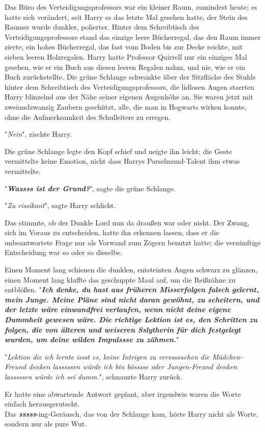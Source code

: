 {Das Büro des Verteidigungsprofessors war ein kleiner Raum, zumindest heute; es hatte sich verändert, seit Harry es das letzte Mal gesehen hatte, der Stein des Raumes wurde dunkler, polierter. Hinter dem Schreibtisch des Verteidigungsprofessors stand das einzige leere Bücherregal, das den Raum immer zierte, ein hohes Bücherregal, das fast vom Boden bis zur Decke reichte, mit sieben leeren Holzregalen. Harry hatte Professor Quirrell nur ein einziges Mal gesehen, wie er ein Buch aus diesen leeren Regalen nahm, und nie, wie er ein Buch zurückstellte. Die grüne Schlange schwankte über der Sitzfläche des Stuhls hinter dem Schreibtisch des Verteidigungsprofessors, die lidlosen Augen starrten Harry blinzelnd aus der Nähe seiner eigenen Augenhöhe an. Sie waren jetzt mit zweiundzwanzig Zaubern geschützt, alle, die man in Hogwarts wirken konnte, ohne die Aufmerksamkeit des Schulleiters zu erregen.

"\emph{Nein}", zischte Harry.

Die grüne Schlange legte den Kopf schief und neigte ihn leicht; die Geste vermittelte keine Emotion, nicht dass Harrys Parselmund-Talent ihm etwas vermittelte.

"\textbf{\emph{Wassss ist der Grund?}}", sagte die grüne Schlange.

"\emph{Zu rissikant}", sagte Harry schlicht.

Das stimmte, ob der Dunkle Lord nun da draußen war oder nicht. Der Zwang, sich im Voraus zu entscheiden, hatte ihn erkennen lassen, dass er die unbeantwortete Frage nur als Vorwand zum Zögern benutzt hatte; die vernünftige Entscheidung war so oder so dieselbe.

Einen Moment lang schienen die dunklen, entsteinten Augen schwarz zu glänzen, einen Moment lang klaffte das geschuppte Maul auf, um die Reißzähne zu entblößen. "\textbf{\emph{Ich denke, du hast aus früheren Misserfolgen falsch gelernt, mein Junge. Meine Pläne sind nicht daran gewöhnt, zu scheitern, und der letzte wäre einwandfrei verlaufen, wenn nicht deine eigene Dummheit gewesen wäre. Die richtige Lektion ist es, den Schritten zu folgen, die von älteren und weiseren Sslytherin für dich festgelegt wurden, um deine wilden Impulssse zu zähmen.}}"

"\emph{Lektion die ich lernte issst es, keine Intrigen zu verssssuchen die Mädchen-Freund denken lasssssen würde ich bin bösssse oder Jungen-Freund denken lasssssen würde ich sei dumm.}", schnauzte Harry zurück.

Er hatte eine abwartende Antwort geplant, aber irgendwie waren die Worte einfach herausgerutscht.\\ Das \textbf{\emph{sssss}}-ing-Geräusch, das von der Schlange kam, hörte Harry nicht als Worte, sondern nur als pure Wut.

}
